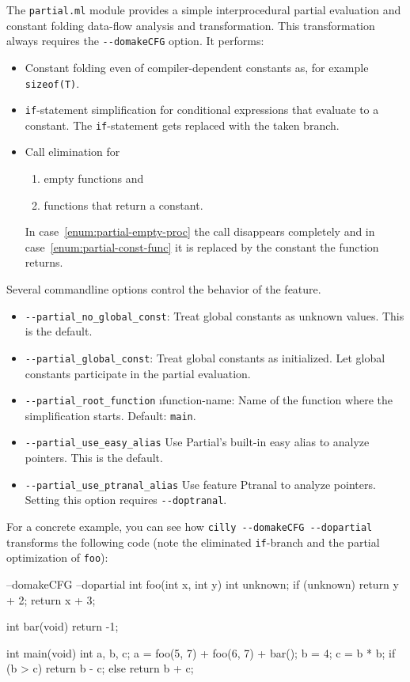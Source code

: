 \documentclass{article}
\def\t#1{{\tt #1}}
\begin{document}
The \t{partial.ml} module provides a simple interprocedural partial
evaluation and constant folding data-flow analysis and transformation.
This transformation always requires the \t{-{}-domakeCFG} option.  It
performs:
\begin{itemize}
\item Constant folding even of compiler-dependent constants as, for
  example \t{sizeof(T)}.
\item \t{if}-statement simplification for conditional expressions that
  evaluate to a constant.  The \t{if}-statement gets replaced with the
  taken branch.
\item Call elimination for
  \begin{enumerate}
  \item\label{enum:partial-empty-proc} empty functions and
  \item\label{enum:partial-const-func} functions that return a
    constant.
  \end{enumerate}
  In case~\ref{enum:partial-empty-proc} the call disappears completely
  and in case~\ref{enum:partial-const-func} it is replaced by the
  constant the function returns.
\end{itemize}

Several commandline options control the behavior of the feature.
\begin{itemize}
\item \t{-{}-partial\_no\_global\_const}:
 Treat global constants as unknown values.  This is the default.
\item \t{-{}-partial\_global\_const}:
 Treat global constants as initialized.  Let global constants
 participate in the partial evaluation.
\item \t{-{}-partial\_root\_function} \i{function-name}:
  Name of the function where the simplification starts.  Default:
  \t{main}.
\item \t{-{}-partial\_use\_easy\_alias}
  Use Partial's built-in easy alias to analyze pointers.  This is the
  default.
\item \t{-{}-partial\_use\_ptranal\_alias}
  Use feature Ptranal to analyze pointers.  Setting this option
  requires \t{-{}-doptranal}.
\end{itemize}

For a concrete example, you can see how \t{cilly -{}-domakeCFG -{}-dopartial}
transforms the following code (note the eliminated \t{if}-branch and the
partial optimization of \t{foo}):

\begin{cilcode}[global] --domakeCFG --dopartial
  int foo(int x, int y) {
    int unknown;
    if (unknown)
      return y + 2;
    return x + 3;
  }

  int bar(void) {
    return -1;
  }

  int main(void) {
    int a, b, c;
    a = foo(5, 7) + foo(6, 7) + bar();
    b = 4;
    c = b * b;
    if (b > c)
      return b - c;
    else
      return b + c;
  }
\end{cilcode}
\end{document}
